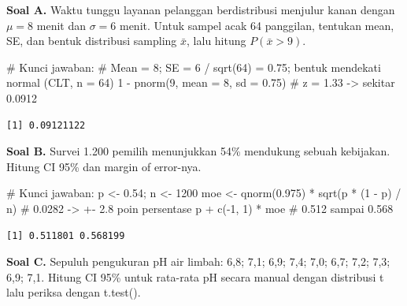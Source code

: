 \documentclass[
  indonesian,
  letterpaper,
]{book}
\newenvironment{Shaded}{\begin{snugshade}}{\end{snugshade}}
\newcommand{\AttributeTok}[1]{\textcolor[rgb]{0.40,0.45,0.13}{#1}}
\newcommand{\CommentTok}[1]{\textcolor[rgb]{0.37,0.37,0.37}{#1}}
\newcommand{\DecValTok}[1]{\textcolor[rgb]{0.68,0.00,0.00}{#1}}
\newcommand{\FloatTok}[1]{\textcolor[rgb]{0.68,0.00,0.00}{#1}}
\newcommand{\FunctionTok}[1]{\textcolor[rgb]{0.28,0.35,0.67}{#1}}
\newcommand{\NormalTok}[1]{\textcolor[rgb]{0.00,0.23,0.31}{#1}}
\newcommand{\OtherTok}[1]{\textcolor[rgb]{0.00,0.23,0.31}{#1}}
\newcommand{\SpecialCharTok}[1]{\textcolor[rgb]{0.37,0.37,0.37}{#1}}
\begin{document}
\textbf{Soal A.} Waktu tunggu layanan pelanggan berdistribusi menjulur
kanan dengan \(\mu = 8\) menit dan \(\sigma = 6\) menit. Untuk sampel
acak 64 panggilan, tentukan mean, SE, dan bentuk distribusi sampling
\(\bar{x}\), lalu hitung \(P(\bar{x} > 9)\).

\begin{Shaded}
\begin{Highlighting}[]
\CommentTok{\# Kunci jawaban:}
\CommentTok{\# Mean = 8; SE = 6 / sqrt(64) = 0.75; bentuk mendekati normal (CLT, n = 64)}
\DecValTok{1} \SpecialCharTok{{-}} \FunctionTok{pnorm}\NormalTok{(}\DecValTok{9}\NormalTok{, }\AttributeTok{mean =} \DecValTok{8}\NormalTok{, }\AttributeTok{sd =} \FloatTok{0.75}\NormalTok{)  }\CommentTok{\# z = 1.33 {-}\textgreater{} sekitar 0.0912}
\end{Highlighting}
\end{Shaded}

\begin{verbatim}
[1] 0.09121122
\end{verbatim}

\textbf{Soal B.} Survei 1.200 pemilih menunjukkan 54\% mendukung sebuah
kebijakan. Hitung CI 95\% dan margin of error-nya.

\begin{Shaded}
\begin{Highlighting}[]
\CommentTok{\# Kunci jawaban:}
\NormalTok{p }\OtherTok{\textless{}{-}} \FloatTok{0.54}\NormalTok{; n }\OtherTok{\textless{}{-}} \DecValTok{1200}
\NormalTok{moe }\OtherTok{\textless{}{-}} \FunctionTok{qnorm}\NormalTok{(}\FloatTok{0.975}\NormalTok{) }\SpecialCharTok{*} \FunctionTok{sqrt}\NormalTok{(p }\SpecialCharTok{*}\NormalTok{ (}\DecValTok{1} \SpecialCharTok{{-}}\NormalTok{ p) }\SpecialCharTok{/}\NormalTok{ n)  }\CommentTok{\# 0.0282 {-}\textgreater{} +{-} 2.8 poin persentase}
\NormalTok{p }\SpecialCharTok{+} \FunctionTok{c}\NormalTok{(}\SpecialCharTok{{-}}\DecValTok{1}\NormalTok{, }\DecValTok{1}\NormalTok{) }\SpecialCharTok{*}\NormalTok{ moe                          }\CommentTok{\# 0.512 sampai 0.568}
\end{Highlighting}
\end{Shaded}

\begin{verbatim}
[1] 0.511801 0.568199
\end{verbatim}

\textbf{Soal C.} Sepuluh pengukuran pH air limbah: 6,8; 7,1; 6,9; 7,4;
7,0; 6,7; 7,2; 7,3; 6,9; 7,1. Hitung CI 95\% untuk rata-rata pH secara
manual dengan distribusi t lalu periksa dengan t.test().
\end{document}
